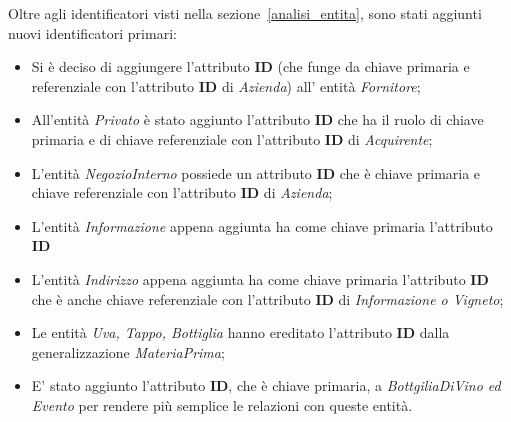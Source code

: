Oltre agli identificatori visti nella sezione~\ref{analisi_entita}, sono stati aggiunti nuovi identificatori primari:

\begin{itemize}
	\item Si è deciso di aggiungere l'attributo \textbf{ID} (che funge da chiave primaria e referenziale con l'attributo \textbf{ID} di \emph{Azienda}) all' entità \emph{Fornitore};
	\item All'entità \emph{Privato} è stato aggiunto l'attributo \textbf{ID} che ha il ruolo di chiave primaria e di chiave referenziale con l'attributo \textbf{ID} di \emph{Acquirente};
	\item L'entità \emph{NegozioInterno} possiede un attributo \textbf{ID} che è chiave primaria e chiave referenziale con l'attributo \textbf{ID} di \emph{Azienda};
	\item L'entità \emph{Informazione} appena aggiunta ha come chiave primaria l'attributo \textbf{ID}
	\item L'entità \emph{Indirizzo} appena aggiunta ha come chiave primaria l'attributo \textbf{ID} che è anche chiave referenziale con l'attributo \textbf{ID} di \emph{Informazione o Vigneto};
	\item Le entità \emph{Uva, Tappo, Bottiglia} hanno ereditato l'attributo \textbf{ID} dalla generalizzazione \emph{MateriaPrima};
	\item E' stato aggiunto l'attributo \textbf{ID}, che è chiave primaria, a \emph{BottgiliaDiVino ed Evento} per rendere più semplice le relazioni con queste entità.
\end{itemize}
